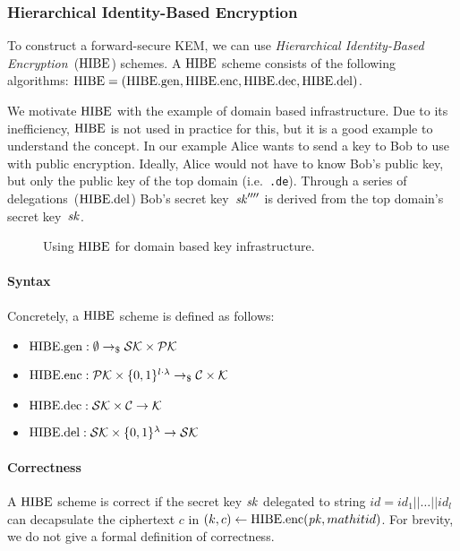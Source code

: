 \subsubsection{Hierarchical Identity-Based Encryption}

To construct a forward-secure KEM, we can use \emph{Hierarchical Identity-Based Encryption}~($\mathrm{HIBE}$) schemes.
A $\mathrm{HIBE}$ scheme consists of the following algorithms: $\mathrm{HIBE} = (\mathrm{HIBE}.\mathrm{gen},\mathrm{HIBE}.\mathrm{enc},\mathrm{HIBE}.\mathrm{dec}, \mathrm{HIBE}.\mathrm{del})$.

We motivate $\mathrm{HIBE}$ with the example of domain based infrastructure.
Due to its inefficiency, $\mathrm{HIBE}$ is not used in practice for this, but it is a good example to understand the concept.
In our example Alice wants to send a key to Bob to use with public encryption.
Ideally, Alice would not have to know Bob's public key, but only the public key of the top domain (i.e.\ \texttt{.de}).
Through a series of delegations~($\mathrm{HIBE}.\mathrm{del}$) Bob's secret key~$\mathit{sk}''''$ is derived from the top domain's secret key~$\mathit{sk}$.

\begin{figure}[!ht]
    \centering
    
    \caption{Using $\mathrm{HIBE}$ for domain based key infrastructure.}
    \label{fig:hibe:example}
\end{figure}

\paragraph{Syntax} Concretely, a $\mathrm{HIBE}$ scheme is defined as follows:
\begin{itemize}
    \item $\mathrm{HIBE}.\mathrm{gen} : \emptyset \to_\$ \mathcal{SK}\times\mathcal{PK}$
    \item $\mathrm{HIBE}.\mathrm{enc}: \mathcal{PK}\times\{0,1\}^{l\cdot\lambda} \to_\$ \mathcal{C}\times\mathcal{K}$
    \item $\mathrm{HIBE}.\mathrm{dec}: \mathcal{SK}\times\mathcal{C} \to \mathcal{K}$
    \item $\mathrm{HIBE}.\mathrm{del}: \mathcal{SK}\times\{0,1\}^\lambda \to \mathcal{SK}$
\end{itemize}

\paragraph{Correctness} A $\mathrm{HIBE}$ scheme is correct if the secret key $\mathit{sk}$ delegated to string $\mathit{id}=\mathit{id}_1||\dots||\mathit{id}_l$ can decapsulate the ciphertext $c$ in $(k,c) \gets \mathrm{HIBE}.\mathrm{enc}(\mathit{pk},mathit{id})$.
For brevity, we do not give a formal definition of correctness.

